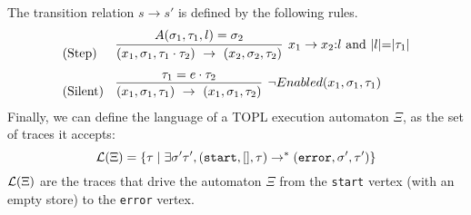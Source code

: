 \documentclass{sigplanconf}[10pt] %
\begin{document}
The transition relation $s \to s'$ is defined by the following rules.
\[
\begin{array}{ll}
\text{(Step)}  &
\infer[x_1 \to x_2{:} l \mbox{ and } |l|{=}|\tau_1| ]{ (x_1,\sigma_1,\tau_1 \cdot \tau_2 ) \  \to \  (x_2, \sigma_2, \tau_2)}{A(\sigma_1,\tau_1,l)=\sigma_2}
\\[2ex]
\text{(Silent)}  &
\infer[\neg Enabled(x_1,\sigma_1,\tau_1) ]{ (x_1,\sigma_1,\tau_1) \  \to \  (x_1, \sigma_1, \tau_2)}{ \tau_1=e \cdot \tau_2}
\end{array}
\]
Finally, we can define the language of a TOPL execution automaton $\Xi$, as the set of traces it accepts:
\[
{\cal L}(\Xi) = \{ \tau \mid \exists \sigma' \tau', (\mathtt{start},[],\tau) \to^* (\mathtt{error},\sigma',\tau')\}
\]
${\cal L}(\Xi)$ are the traces that drive the automaton $\Xi$ from the \texttt{start} vertex (with an empty store) to the \texttt{error} vertex.
\end{document}
